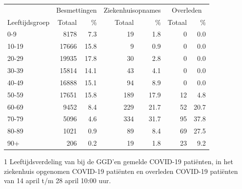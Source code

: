 \documentclass[
  english,
  man,floatsintext]{apa6}
\begin{document}
\begin{table}
\centering\begingroup\fontsize{11}{13}\selectfont

\begin{threeparttable}
\begin{tabular}{lrrrrrr}
\toprule
\multicolumn{1}{c}{ } & \multicolumn{2}{c}{Besmettingen} & \multicolumn{2}{c}{Ziekenhuisopnames} & \multicolumn{2}{c}{Overleden} \\
\cmidrule(l{3pt}r{3pt}){2-3} \cmidrule(l{3pt}r{3pt}){4-5} \cmidrule(l{3pt}r{3pt}){6-7}
Leeftijdsgroep & Totaal & \% & Totaal & \% & Totaal & \%\\
\midrule
0-9 & 8178 & 7.3 & 19 & 1.8 & 0 & 0.0\\
10-19 & 17666 & 15.8 & 9 & 0.9 & 0 & 0.0\\
20-29 & 19935 & 17.8 & 30 & 2.8 & 0 & 0.0\\
30-39 & 15814 & 14.1 & 43 & 4.1 & 0 & 0.0\\
40-49 & 16888 & 15.1 & 94 & 8.9 & 0 & 0.0\\
50-59 & 17651 & 15.8 & 189 & 17.9 & 12 & 4.8\\
60-69 & 9452 & 8.4 & 229 & 21.7 & 52 & 20.7\\
70-79 & 5096 & 4.6 & 334 & 31.7 & 95 & 37.8\\
80-89 & 1021 & 0.9 & 89 & 8.4 & 69 & 27.5\\
90+ & 206 & 0.2 & 19 & 1.8 & 23 & 9.2\\
\bottomrule
\end{tabular}
\begin{tablenotes}
\item[1] Leeftijdsverdeling van bij de GGD’en gemelde COVID-19 patiënten, in het ziekenhuis opgenomen COVID-19 patiënten en overleden COVID-19 patiënten van 14 april t/m 28 april 10:00 uur.
\end{tablenotes}
\end{threeparttable}
\endgroup{}
\end{table}

\newpage
\end{document}
